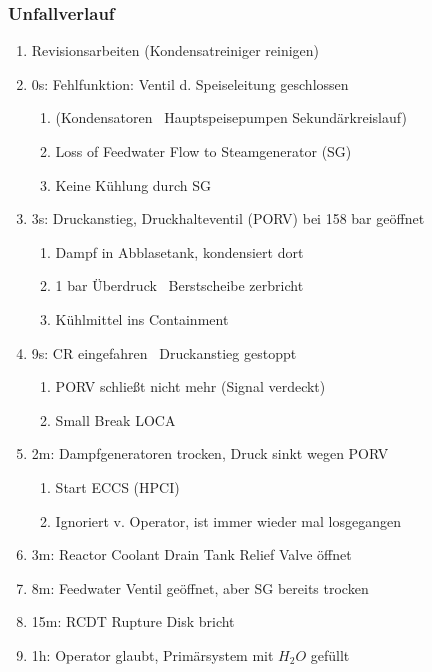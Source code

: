 \documentclass[12pt]{article}
\begin{document}
\subsubsection{Unfallverlauf}
\begin{enumerate}
	\item Revisionsarbeiten (Kondensatreiniger reinigen)
	\item 0s: Fehlfunktion: Ventil d. Speiseleitung geschlossen
		\begin{enumerate}[label = \textrightarrow]
			\item (Kondensatoren \textrightarrow\ Hauptspeisepumpen Sekundärkreislauf)
			\item Loss of Feedwater Flow to Steamgenerator (SG)
			\item Keine Kühlung durch SG
		\end{enumerate}
	\item 3s: Druckanstieg, Druckhalteventil (PORV) bei 158 bar geöffnet
		\begin{enumerate}[label = \textrightarrow]
			\item Dampf in Abblasetank, kondensiert dort
			\item 1 bar Überdruck \textrightarrow\ Berstscheibe zerbricht
			\item Kühlmittel ins Containment
		\end{enumerate}
	\item 9s: CR eingefahren \textrightarrow\ Druckanstieg gestoppt
		\begin{enumerate}[label = \textrightarrow]
			\item PORV schließt nicht mehr (Signal verdeckt)
			\item Small Break LOCA
		\end{enumerate}
	\item 2m: Dampfgeneratoren trocken, Druck sinkt wegen PORV
		\begin{enumerate}[label = \textrightarrow]
			\item Start ECCS (HPCI)
			\item Ignoriert v. Operator, ist immer wieder mal losgegangen
		\end{enumerate}
	\item 3m: Reactor Coolant Drain Tank Relief Valve öffnet
	\item 8m: Feedwater Ventil geöffnet, aber SG bereits trocken
	\item 15m: RCDT Rupture Disk bricht
	\item 1h: Operator glaubt, Primärsystem mit \(H_2O\) gefüllt
		\begin{enumerate}[label = \textrightarrow]

\end{enumerate}
\end{enumerate}
\end{document}
